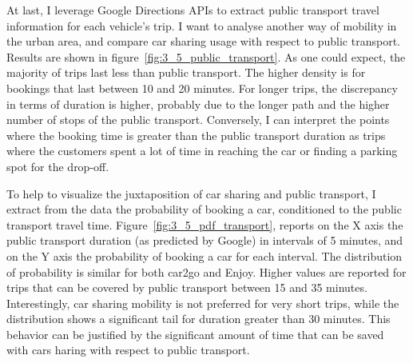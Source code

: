 At last, I leverage Google Directions APIs to extract public transport travel information for each vehicle's trip. I want to analyse another way of mobility in the urban area, and compare car sharing usage with respect to public transport. Results are shown in figure~\ref{fig:3_5_public_transport}.
As one could expect, the majority of trips last less than public transport. The higher density is for bookings that last between 10 and 20 minutes. For longer trips, the discrepancy in terms of duration is higher, probably due to the longer path and the higher number of stops of the public transport. Conversely, I can interpret the points where the booking time is greater than  the public transport duration as trips where the customers spent a lot of time in reaching the car or finding a parking spot for the drop-off.


To help to visualize the juxtaposition of car sharing and public transport, I extract from the data the probability of booking a car, conditioned to the public transport travel time. Figure~\ref{fig:3_5_pdf_transport}, reports on the X axis the public transport duration (as predicted by Google) in intervals of 5 minutes, and on the Y axis the probability of booking a car for each interval.
The distribution of probability is similar for both car2go and Enjoy. Higher values are reported for trips that can be covered by public transport between 15 and 35 minutes. Interestingly, car sharing mobility is not preferred for very short trips, while the distribution shows a significant tail for duration greater than 30 minutes. This behavior can be justified by the significant amount of time that can be saved with cars haring with respect to public transport.

  
